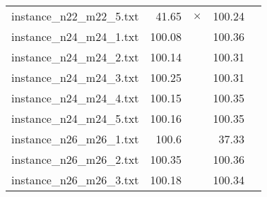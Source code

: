 \documentclass{article}
\begin{document}
\begin{center}
\begin{tabular}{lrrrr}
instance\_n22\_m22\_5.txt & 41.65 & 
$\times$
 & 100.24 & 
\\
instance\_n24\_m24\_1.txt & 100.08 & 
 & 100.36 & 
\\
instance\_n24\_m24\_2.txt & 100.14 & 
 & 100.31 & 
\\
instance\_n24\_m24\_3.txt & 100.25 & 
 & 100.31 & 
\\
instance\_n24\_m24\_4.txt & 100.15 & 
 & 100.35 & 
\\
instance\_n24\_m24\_5.txt & 100.16 & 
 & 100.35 & 
\\
instance\_n26\_m26\_1.txt & 100.6 & 
 & 37.33 & 
\\
instance\_n26\_m26\_2.txt & 100.35 & 
 & 100.36 & 
\\
instance\_n26\_m26\_3.txt & 100.18 & 
 & 100.34 & 
\\
\hline\end{tabular}
\end{center}
\end{document}
